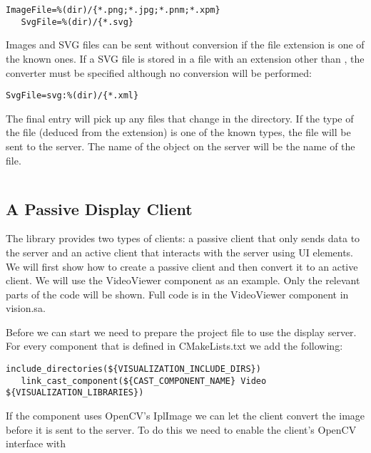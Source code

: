 \begin{Verbatim}[fontsize=\scriptsize,gobble=3]
   ImageFile=%(dir)/{*.png;*.jpg;*.pnm;*.xpm}
   SvgFile=%(dir)/{*.svg}
\end{Verbatim}

Images and SVG files can be sent without conversion if the file extension is
one of the known ones. If a SVG file is stored in a file with an extension
other than , the converter must be specified although no conversion
will be performed:

\begin{Verbatim}[fontsize=\scriptsize,gobble=3]
   SvgFile=svg:%(dir)/{*.xml}
\end{Verbatim}

The final entry will pick up any files that change in the directory. If the
type of the file (deduced from the extension) is one of the known types, the
file will be sent to the server. The name of the object on the server will be
the name of the file.

\begin{Verbatim}[fontsize=\scriptsize,gobble=3]
   %(dir)/{*}"
\end{Verbatim}

\subsection{A Passive Display Client}

The library provides two types of clients: a passive client that only sends
data to the server and an active client that interacts with the server using UI
elements. We will first show how to create a passive client and then convert it
to an active client. We will use the VideoViewer component as an example. Only
the relevant parts of the code will be shown. Full code is in the VideoViewer
component in vision.sa.

Before we can start we need to prepare the project file to use the display server.
For every component that is defined in CMakeLists.txt we add the following:

\begin{Verbatim}[fontsize=\scriptsize,gobble=3]
   include_directories(${VISUALIZATION_INCLUDE_DIRS})
   link_cast_component(${CAST_COMPONENT_NAME} Video ${VISUALIZATION_LIBRARIES})
\end{Verbatim}

If the component uses OpenCV's IplImage we can let the client convert the image
before it is sent to the server. To do this we need to enable the client's OpenCV
interface with

